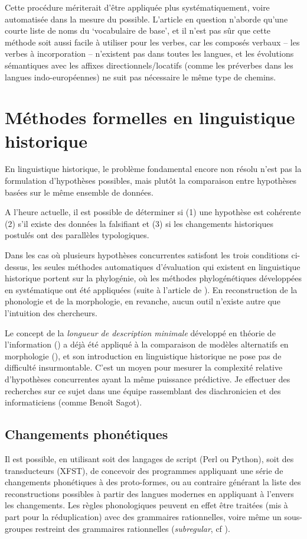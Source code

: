 \documentclass[oldfontcommands,oneside,a4paper,11pt]{article}
\begin{document}
Cette procédure mériterait d'être appliquée plus systématiquement, voire automatisée dans la mesure du possible. L'article en question n'aborde qu'une courte liste de noms du `vocabulaire de base', et il n'est pas sûr que cette méthode soit aussi facile à utiliser pour les verbes, car les composés verbaux -- les verbes à incorporation -- n'existent pas dans toutes les langues, et les évolutions sémantiques avec les affixes directionnels/locatifs (comme les préverbes dans les langues indo-européennes) ne suit pas nécessaire le même type de chemins.

\section{Méthodes formelles en linguistique historique}

En linguistique historique, le problème fondamental encore non résolu n'est pas la formulation d'hypothèses possibles, mais plutôt la comparaison entre hypothèses basées sur le même ensemble de données. 

A l'heure actuelle, il est possible de déterminer si (1) une hypothèse est cohérente (2) s'il existe des données la falsifiant et (3) si les changements historiques postulés ont des parallèles typologiques. 

Dans les cas où plusieurs hypothèses concurrentes satisfont les trois conditions ci-dessus, les seules méthodes automatiques d'évaluation qui existent en linguistique historique portent sur la phylogénie, où les méthodes phylogénétiques développées en systématique ont été appliquées (suite à l'article de \citealt{gray03ie}). En reconstruction de la phonologie et de la morphologie, en revanche, aucun outil n'existe autre que l'intuition des chercheurs. 

Le concept de la \textit{longueur de description minimale} développé en théorie de l'information (\citealt{rissanen84}) a déjà été appliqué à la comparaison de modèles alternatifs en morphologie (\citealt{walther14compactness}), et son introduction en linguistique historique ne pose pas de difficulté insurmontable. C'est un moyen pour mesurer la complexité relative d'hypothèses concurrentes ayant la même puissance prédictive. Je effectuer des recherches sur ce sujet dans une équipe rassemblant des diachronicien et des informaticiens (comme Benoît Sagot).


\subsection{Changements phonétiques}
Il est possible, en utilisant soit des langages de script (Perl ou Python), soit des transducteurs (XFST), de concevoir des programmes appliquant une série de changements phonétiques à des proto-formes, ou au contraire générant la liste des reconstructions possibles à partir des langues modernes en appliquant à l'envers les changements. Les règles phonologiques peuvent en effet être traitées (mis à part pour la réduplication) avec des grammaires rationnelles, voire même un sous-groupes restreint des grammaires rationnelles (\textit{subregular}, cf \citealt{heinz10subregular}).
\end{document}

